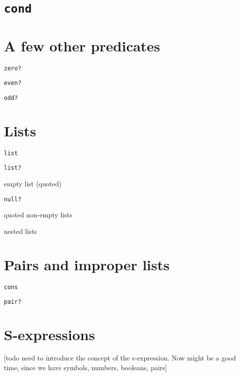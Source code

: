 \documentclass{book}
\begin{document}



\section{\texttt{cond}}

\section{A few other predicates}

\verb|zero?|

\verb|even?|

\verb|odd?|

\section{Lists}

\verb|list|

\verb|list?|

empty list (quoted)

\verb|null?|

quoted non-empty lists

nested lists




\section{Pairs and improper lists}

\verb|cons|

\verb|pair?|

\section{S-expressions}

[todo need to introduce the concept of the s-expression.  Now might be a good time, since we have symbols, numbers, booleans, pairs]
\end{document}
